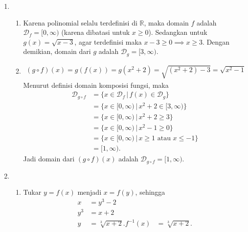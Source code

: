 \documentclass[11pt,openany,a4paper]{article}
\newcommand{\R}{\mathbb{R}}
\begin{document}
\begin{enumerate}
    \item \begin{enumerate}
              \item Karena polinomial selalu terdefinisi di $\R$, maka domain $f$ adalah $\mathcal{D}_f = [0,\infty)$ (karena dibatasi untuk $x\geq 0$). Sedangkan untuk $g(x) = \sqrt{x-3}$, agar terdefinisi maka $x-3 \geq 0 \implies x \geq 3$. Dengan demikian, domain dari $g$ adalah $\mathcal{D}_g = [3,\infty)$.
              \item \begin{align*}
                        (g \circ f)(x)  = g(f(x))
                        = g(x^2 + 2)
                        = \sqrt{(x^2 + 2) - 3}
                        = \sqrt{x^2 - 1}
                    \end{align*}
                    Menurut definisi domain komposisi fungsi, maka
                    \begin{align*}
                        \mathcal{D}_{g \circ f} & = \{x \in \mathcal{D}_f \,|\, f(x) \in \mathcal{D}_g\}        \\
                                                & = \{x \in [0,\infty) \,|\, x^2 + 2 \in [3,\infty)\}           \\
                                                & = \{x \in [0,\infty) \,|\, x^2 + 2 \geq 3\}                   \\
                                                & = \{x \in [0,\infty) \,|\, x^2 - 1 \geq 0\}                   \\
                                                & = \{x \in [0,\infty) \,|\, x \geq 1 \text{ atau } x \leq -1\} \\
                                                & = [1,\infty).
                    \end{align*}
                    Jadi domain dari $(g \circ f)(x)$ adalah $\mathcal{D}_{g \circ f} = [1,\infty)$.
          \end{enumerate}
    \item \begin{enumerate}
              \item Tukar $y = f(x)$ menjadi $x = f(y)$, sehingga
                    \begin{align*}
                        x         & = y^3 - 2          \\
                        y^3       & = x + 2            \\
                        y         & = \sqrt[3]{x + 2}.
                        f^{-1}(x) & = \sqrt[3]{x + 2}.

\end{align*}
\end{enumerate}
\end{enumerate}
\end{document}
